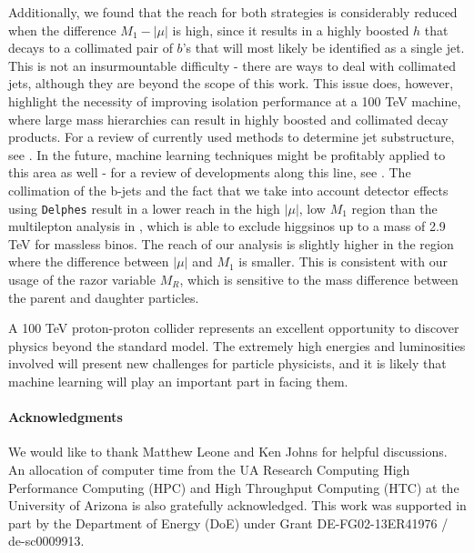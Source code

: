 Additionally, we found that the reach for both strategies is considerably reduced when the difference $M_1 - |\mu|$ is high, since it results in a highly boosted $h$ that decays to a collimated pair of $b$'s that will most likely be identified as a single jet. This is not an insurmountable difficulty - there are ways to deal with collimated jets, although they are beyond the scope of this work. This issue does, however, highlight the necessity of improving isolation performance at a 100 TeV machine, where large mass hierarchies can result in highly boosted and collimated decay products. For a review of currently used methods to determine jet substructure, see \citep{Shelton:2013an}. In the future, machine learning techniques might be profitably applied to this area as well - for a review of developments along this line, see \citep{Schwartzman:2016jqu}. The collimation of the b-jets and the fact that we take into account detector effects using \texttt{Delphes} result in a lower reach in the high $|\mu|$, low $M_1$ region than the multilepton analysis in \citep{Gori:2014oua}, which is able to exclude higgsinos up to a mass of 2.9 TeV for massless binos. The reach of our analysis is slightly higher in the region where the difference between $|\mu|$ and $M_1$ is smaller. This is consistent with our usage of the razor variable $M_R$, which is sensitive to the mass difference between the parent and daughter particles.

A 100 TeV proton-proton collider represents an excellent opportunity to discover physics beyond the standard model. The extremely high energies and luminosities involved will present new challenges for particle physicists, and it is likely that machine learning will play an important part in facing them. 

\paragraph{Acknowledgments}
We would like to thank Matthew Leone and Ken Johns for helpful discussions. An allocation of computer time from the UA Research Computing High Performance Computing (HPC) and High Throughput Computing (HTC) at the University of Arizona is also gratefully acknowledged. This work was supported in part by the Department of Energy (DoE) under Grant DE-FG02-13ER41976 / de-sc0009913.

